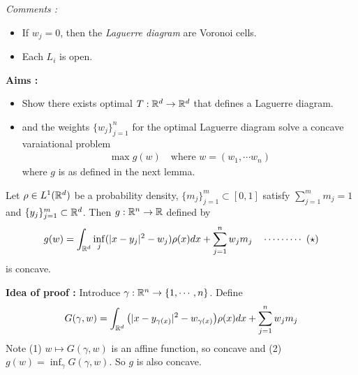 \documentclass[12pt,a4paper]{article}
\newenvironment{proof}
{\begin{changemargin}{1cm}{0.5cm} 
	}%
	{\end{changemargin}
}
\renewenvironment{i}
{\begin{itemize} 
	}%
	{\end{itemize}
}
\newenvironment{p}
{\begin{proof} 
	}%
	{\end{proof}
}
\begin{document}
\emph{Comments :}
\begin{i}
\item If $w_j =0$, then the \emph{Laguerre diagram} are Voronoi cells.
\item Each $L_i$ is open.
\end{i}
\s

\textbf{Aims :}
\begin{i}
\item Show there exists optimal $T: \mathbb{R}^d \rightarrow \mathbb{R}^d$ that defines a Laguerre diagram.
\item and the weights $\{w_j\}_{j=1}^n$ for the optimal Laguerre diagram solve a concave varaiational problem
\begin{align*}
\max g(w) \quad \text{where } w= (w_1, \cdots w_n)
\end{align*} 
where $g$ is as defined in the next lemma.
\end{i}
\s

 Let $\rho \in L^1(\mathbb{R}^d)$ be a probability density, $\{m_j \}_{j=1}^m \subset [0,1]$ satisfy $\sum_{j=1}^m m_j =1$ and $\{y_j \}_{j=1}^m \subset \mathbb{R}^d$. Then $g: \mathbb{R}^n \rightarrow \mathbb{R}$ defined by 
\begin{align*}
g(w) = \int_{\mathbb{R}^d} \inf_j (|x-y_j|^2 - w_j) \rho(x) dx + \sum_{j=1}^n w_j m_j \quad \cdots\cdots\cdots\,\,(\star)
\end{align*}
is concave.
\begin{p}
\textbf{Idea of proof :} Introduce $\gamma : \mathbb{R}^n \rightarrow \{1, \cdots, n \}$. Define
\begin{align*}
G(\gamma, w) = \int_{\mathbb{R}^d} \big( |x-y_{\gamma(x)}|^2 - w_{\gamma(x)}\big) \rho(x) dx + \sum_{j=1}^n w_j m_j
\end{align*}
Note (1) $w\mapsto G(\gamma, w)$ is an affine function, so concave and (2) $g(w) = \inf_{\gamma} G(\gamma, w)$. So $g$ is also concave.
\end{p}
\s
\end{document}
